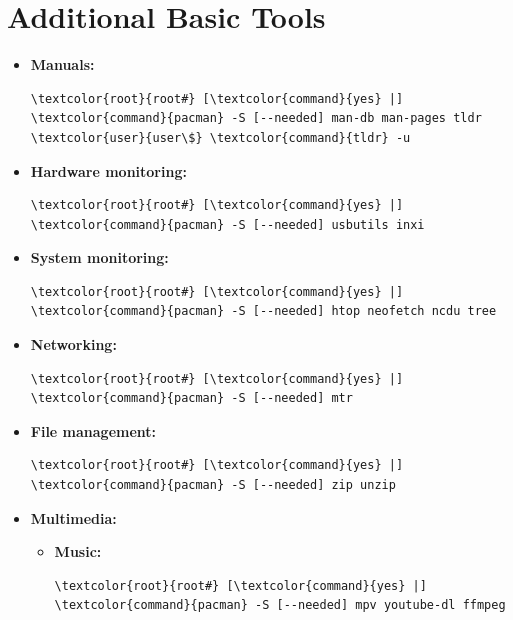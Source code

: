 \documentclass[10pt, a4paper, onecolumn, oneside, titlepage, openany]{book}
\begin{document}
\section{Additional Basic Tools}
\begin{itemize}
    \item \textbf{Manuals:}
\begin{Verbatim}[commandchars=\\\{\}]
\textcolor{root}{root#} [\textcolor{command}{yes} |] \textcolor{command}{pacman} -S [--needed] man-db man-pages tldr
\textcolor{user}{user\$} \textcolor{command}{tldr} -u
\end{Verbatim}    
    \item \textbf{Hardware monitoring:}
\begin{Verbatim}[commandchars=\\\{\}]
\textcolor{root}{root#} [\textcolor{command}{yes} |] \textcolor{command}{pacman} -S [--needed] usbutils inxi
\end{Verbatim}
    \item \textbf{System monitoring:}
\begin{Verbatim}[commandchars=\\\{\}]
\textcolor{root}{root#} [\textcolor{command}{yes} |] \textcolor{command}{pacman} -S [--needed] htop neofetch ncdu tree
\end{Verbatim}
    \item \textbf{Networking:}
\begin{Verbatim}[commandchars=\\\{\}]
\textcolor{root}{root#} [\textcolor{command}{yes} |] \textcolor{command}{pacman} -S [--needed] mtr
\end{Verbatim}
    \item \textbf{File management:}
\begin{Verbatim}[commandchars=\\\{\}]
\textcolor{root}{root#} [\textcolor{command}{yes} |] \textcolor{command}{pacman} -S [--needed] zip unzip
\end{Verbatim}
    \item \textbf{Multimedia:}
    \begin{itemize}
        \item \textbf{Music:}
\begin{Verbatim}[commandchars=\\\{\}]
\textcolor{root}{root#} [\textcolor{command}{yes} |] \textcolor{command}{pacman} -S [--needed] mpv youtube-dl ffmpeg
\end{Verbatim}        
    \end{itemize}
\end{itemize}
\end{document}
